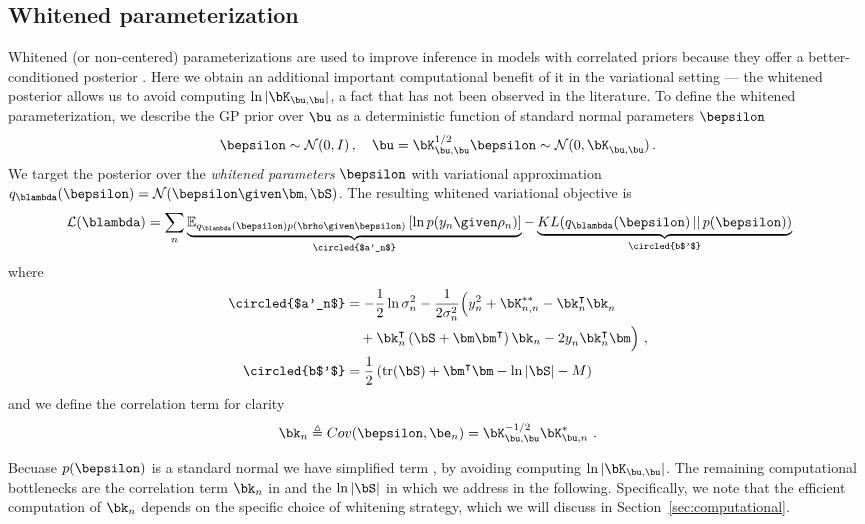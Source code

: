 \subsection{Whitened parameterization}
\label{sec:whitened}

Whitened (or non-centered) parameterizations are used to improve
inference in models with correlated priors because they offer a
better-conditioned posterior
\citep{murray2010slice, hensman2015mcmc}.
Here we obtain an additional important computational benefit of it
in the variational setting --- the whitened posterior allows us to
avoid computing $\ln |\bK_{\bu,\bu}|$, a fact that has not been observed
in the literature.
To define the whitened parameterization, we describe the GP prior over
$\bu$ as a deterministic function of standard normal parameters $\bepsilon$
\begin{align}
  \bepsilon \sim \mathcal{N}(0, I) \,, \quad
  \bu = \bK_{\bu,\bu}^{1/2} \bepsilon \sim \mathcal{N}(0, \bK^{}_{\bu,\bu}) \,.
   \label{eq:matrix-sqrt}
\end{align}
We target the posterior over
the \emph{whitened parameters}
$\bepsilon$ with variational approximation
${q_{\blambda}(\bepsilon) = \mathcal{N}(\bepsilon \given \bm, \bS)}$.
The resulting whitened variational objective is
\begin{align*}
\mathcal{L}(\blambda)
  &= \sum_{n} \underbrace{
  	    \mathbb{E}_{q_{\blambda}(\bepsilon) p(\brho \given \bepsilon)} \left[
	    	\ln p(y_n \given \rho_n)
	    \right]
	  }_{\circled{$a'_n$}} -
      \underbrace{
	  	KL(q_{\blambda}(\bepsilon) \,||\, p(\bepsilon))
	  }_{\circled{b$'$}} \,
\end{align*}
where
\begin{align}
\circled{$a'_n$}
&= -\frac{1}{2}\ln \sigma_n^2 - \frac{1}{2\sigma_n^2}
    \Big( y_n^2 + \bK^{**}_{n,n} - \bk_n^\intercal \bk^{}_n  \nonumber \\
&\quad + \bk_n^\intercal
     \left( \bS + \bm \bm^\intercal \right) \bk_n - 2 y^{}_n \bk_n^\intercal \bm
    \Big) \,\,,\\
\circled{b$'$}
  &= \frac{1}{2}\left( \text{tr}(\bS) + \bm^\intercal \bm - \ln |\bS| - M \right) \,
\label{eq:kl-term}
\end{align}
 and we define the correlation term for clarity
 \begin{align}
    \bk_n \triangleq Cov(\bepsilon, \be_n)  = \bK_{\bu,\bu}^{-1/2}\bK^*_{\bu,n}  \,\,.
    \label{eq:k-vector}
 \end{align}

Becuase $p(\bepsilon)$ is a standard normal we have simplified term ,
by avoiding computing $\ln |\bK_{\bu,\bu}|$.
The remaining computational bottlenecks are
the correlation term $\bk_n$ in  and the $\ln |\bS|$ in 
which we address in the following.
Specifically, we note that the efficient computation of $\bk_n$
depends on the specific choice of whitening strategy,
which we will discuss in Section~\ref{sec:computational}.
